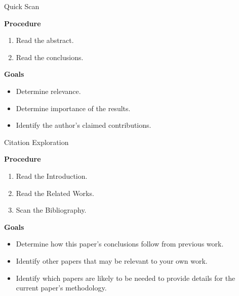 \documentclass[handout]{beamer}
\begin{document}
\begin{frame}{Quick Scan}

    {\bf Procedure}
    \begin{enumerate}
        \item Read the abstract.
        \item Read the conclusions.
    \end{enumerate}
    
    \vspace{1em}
    
    {\bf Goals}
    \begin{itemize}
        \item Determine relevance.
        \item Determine importance of the results.
        \item Identify the author's claimed contributions.
    \end{itemize}
    
\end{frame}


\begin{frame}{Citation Exploration}

    {\bf Procedure}
    \begin{enumerate}
        \item Read the Introduction.
        \item Read the Related Works.
        \item Scan the Bibliography.
    \end{enumerate}
    
    \vspace{1em}
    
    {\bf Goals}
    \begin{itemize}
        \item Determine how this paper's conclusions follow from previous work.
        \item Identify other papers that may be relevant to your own work.
        \item Identify which papers are likely to be needed to provide details for
          the current paper's methodology.
    \end{itemize}
\end{frame}
\end{document}
